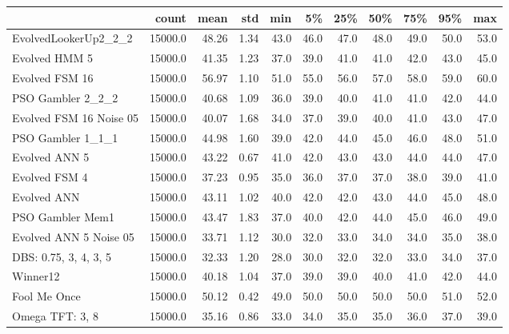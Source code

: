 \begin{tabular}{lrrrrrrrrrr}
\toprule
{} &    count &   mean &   std &   min &    5\% &   25\% &   50\% &   75\% &   95\% &   max \\
\midrule
EvolvedLookerUp2\_2\_2    &  15000.0 &  48.26 &  1.34 &  43.0 &  46.0 &  47.0 &  48.0 &  49.0 &  50.0 &  53.0 \\
Evolved HMM 5           &  15000.0 &  41.35 &  1.23 &  37.0 &  39.0 &  41.0 &  41.0 &  42.0 &  43.0 &  45.0 \\
Evolved FSM 16          &  15000.0 &  56.97 &  1.10 &  51.0 &  55.0 &  56.0 &  57.0 &  58.0 &  59.0 &  60.0 \\
PSO Gambler 2\_2\_2       &  15000.0 &  40.68 &  1.09 &  36.0 &  39.0 &  40.0 &  41.0 &  41.0 &  42.0 &  44.0 \\
Evolved FSM 16 Noise 05 &  15000.0 &  40.07 &  1.68 &  34.0 &  37.0 &  39.0 &  40.0 &  41.0 &  43.0 &  47.0 \\
PSO Gambler 1\_1\_1       &  15000.0 &  44.98 &  1.60 &  39.0 &  42.0 &  44.0 &  45.0 &  46.0 &  48.0 &  51.0 \\
Evolved ANN 5           &  15000.0 &  43.22 &  0.67 &  41.0 &  42.0 &  43.0 &  43.0 &  44.0 &  44.0 &  47.0 \\
Evolved FSM 4           &  15000.0 &  37.23 &  0.95 &  35.0 &  36.0 &  37.0 &  37.0 &  38.0 &  39.0 &  41.0 \\
Evolved ANN             &  15000.0 &  43.11 &  1.02 &  40.0 &  42.0 &  42.0 &  43.0 &  44.0 &  45.0 &  48.0 \\
PSO Gambler Mem1        &  15000.0 &  43.47 &  1.83 &  37.0 &  40.0 &  42.0 &  44.0 &  45.0 &  46.0 &  49.0 \\
Evolved ANN 5 Noise 05  &  15000.0 &  33.71 &  1.12 &  30.0 &  32.0 &  33.0 &  34.0 &  34.0 &  35.0 &  38.0 \\
DBS: 0.75, 3, 4, 3, 5   &  15000.0 &  32.33 &  1.20 &  28.0 &  30.0 &  32.0 &  32.0 &  33.0 &  34.0 &  37.0 \\
Winner12                &  15000.0 &  40.18 &  1.04 &  37.0 &  39.0 &  39.0 &  40.0 &  41.0 &  42.0 &  44.0 \\
Fool Me Once            &  15000.0 &  50.12 &  0.42 &  49.0 &  50.0 &  50.0 &  50.0 &  50.0 &  51.0 &  52.0 \\
Omega TFT: 3, 8         &  15000.0 &  35.16 &  0.86 &  33.0 &  34.0 &  35.0 &  35.0 &  36.0 &  37.0 &  39.0 \\
\bottomrule
\end{tabular}
